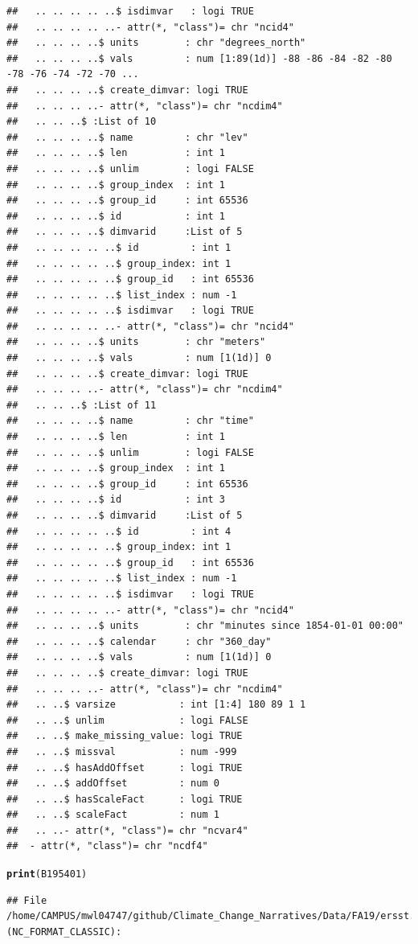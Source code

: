 \documentclass{article}\usepackage[]{graphicx}\usepackage[]{color}
\makeatletter
\newcommand{\hlstd}[1]{\textcolor[rgb]{0.345,0.345,0.345}{#1}}%
\newcommand{\hlkwd}[1]{\textcolor[rgb]{0.737,0.353,0.396}{\textbf{#1}}}%
\newenvironment{kframe}{%
 \def\at@end@of@kframe{}%
 \ifinner\ifhmode%
  \def\at@end@of@kframe{\end{minipage}}%
  \begin{minipage}{\columnwidth}%
 \fi\fi%
 \def\FrameCommand##1{\hskip\@totalleftmargin \hskip-\fboxsep
 \colorbox{shadecolor}{##1}\hskip-\fboxsep
     \hskip-\linewidth \hskip-\@totalleftmargin \hskip\columnwidth}%
 \MakeFramed {\advance\hsize-\width
   \@totalleftmargin\z@ \linewidth\hsize
   \@setminipage}}%
 {\par\unskip\endMakeFramed%
 \at@end@of@kframe}
\newenvironment{knitrout}{}{} %
\makeatother
\begin{document}
\begin{knitrout}
\begin{kframe}
\begin{verbatim}
##   .. .. .. .. ..$ isdimvar   : logi TRUE
##   .. .. .. .. ..- attr(*, "class")= chr "ncid4"
##   .. .. .. ..$ units        : chr "degrees_north"
##   .. .. .. ..$ vals         : num [1:89(1d)] -88 -86 -84 -82 -80 -78 -76 -74 -72 -70 ...
##   .. .. .. ..$ create_dimvar: logi TRUE
##   .. .. .. ..- attr(*, "class")= chr "ncdim4"
##   .. .. ..$ :List of 10
##   .. .. .. ..$ name         : chr "lev"
##   .. .. .. ..$ len          : int 1
##   .. .. .. ..$ unlim        : logi FALSE
##   .. .. .. ..$ group_index  : int 1
##   .. .. .. ..$ group_id     : int 65536
##   .. .. .. ..$ id           : int 1
##   .. .. .. ..$ dimvarid     :List of 5
##   .. .. .. .. ..$ id         : int 1
##   .. .. .. .. ..$ group_index: int 1
##   .. .. .. .. ..$ group_id   : int 65536
##   .. .. .. .. ..$ list_index : num -1
##   .. .. .. .. ..$ isdimvar   : logi TRUE
##   .. .. .. .. ..- attr(*, "class")= chr "ncid4"
##   .. .. .. ..$ units        : chr "meters"
##   .. .. .. ..$ vals         : num [1(1d)] 0
##   .. .. .. ..$ create_dimvar: logi TRUE
##   .. .. .. ..- attr(*, "class")= chr "ncdim4"
##   .. .. ..$ :List of 11
##   .. .. .. ..$ name         : chr "time"
##   .. .. .. ..$ len          : int 1
##   .. .. .. ..$ unlim        : logi FALSE
##   .. .. .. ..$ group_index  : int 1
##   .. .. .. ..$ group_id     : int 65536
##   .. .. .. ..$ id           : int 3
##   .. .. .. ..$ dimvarid     :List of 5
##   .. .. .. .. ..$ id         : int 4
##   .. .. .. .. ..$ group_index: int 1
##   .. .. .. .. ..$ group_id   : int 65536
##   .. .. .. .. ..$ list_index : num -1
##   .. .. .. .. ..$ isdimvar   : logi TRUE
##   .. .. .. .. ..- attr(*, "class")= chr "ncid4"
##   .. .. .. ..$ units        : chr "minutes since 1854-01-01 00:00"
##   .. .. .. ..$ calendar     : chr "360_day"
##   .. .. .. ..$ vals         : num [1(1d)] 0
##   .. .. .. ..$ create_dimvar: logi TRUE
##   .. .. .. ..- attr(*, "class")= chr "ncdim4"
##   .. ..$ varsize           : int [1:4] 180 89 1 1
##   .. ..$ unlim             : logi FALSE
##   .. ..$ make_missing_value: logi TRUE
##   .. ..$ missval           : num -999
##   .. ..$ hasAddOffset      : logi TRUE
##   .. ..$ addOffset         : num 0
##   .. ..$ hasScaleFact      : logi TRUE
##   .. ..$ scaleFact         : num 1
##   .. ..- attr(*, "class")= chr "ncvar4"
##  - attr(*, "class")= chr "ncdf4"
\end{verbatim}
\begin{alltt}
\hlkwd{print}\hlstd{(B195401)}
\end{alltt}
\begin{verbatim}
## File /home/CAMPUS/mwl04747/github/Climate_Change_Narratives/Data/FA19/ersst.v5.185401.nc (NC_FORMAT_CLASSIC):

\end{verbatim}
\end{kframe}
\end{knitrout}
\end{document}
